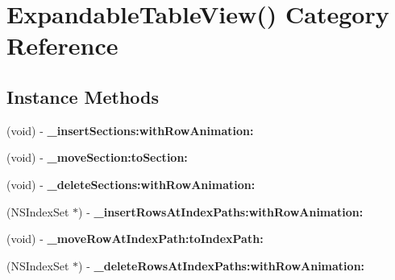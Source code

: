 \hypertarget{category_expandable_table_view_07_08}{\section{Expandable\-Table\-View() Category Reference}
\label{category_expandable_table_view_07_08}
}
\subsection*{Instance Methods}
\begin{DoxyCompactItemize}
\item 
\hypertarget{category_expandable_table_view_07_08_a7ec3087844f79fffff796ba6d897bdad}{(void) -\/ {\bfseries \-\_\-insert\-Sections\-:with\-Row\-Animation\-:}}\label{category_expandable_table_view_07_08_a7ec3087844f79fffff796ba6d897bdad}

\item 
\hypertarget{category_expandable_table_view_07_08_a74cdc0f4b8f277523ad07f548e80148f}{(void) -\/ {\bfseries \-\_\-move\-Section\-:to\-Section\-:}}\label{category_expandable_table_view_07_08_a74cdc0f4b8f277523ad07f548e80148f}

\item 
\hypertarget{category_expandable_table_view_07_08_a5efa2d8e890efcf5fd20f9a8a86a853b}{(void) -\/ {\bfseries \-\_\-delete\-Sections\-:with\-Row\-Animation\-:}}\label{category_expandable_table_view_07_08_a5efa2d8e890efcf5fd20f9a8a86a853b}

\item 
\hypertarget{category_expandable_table_view_07_08_a306f7e0615cdec37a9dc3ce03f2da56c}{(N\-S\-Index\-Set $\ast$) -\/ {\bfseries \-\_\-insert\-Rows\-At\-Index\-Paths\-:with\-Row\-Animation\-:}}\label{category_expandable_table_view_07_08_a306f7e0615cdec37a9dc3ce03f2da56c}

\item 
\hypertarget{category_expandable_table_view_07_08_a6c7084133c65766782f2c704ad3de7b5}{(void) -\/ {\bfseries \-\_\-move\-Row\-At\-Index\-Path\-:to\-Index\-Path\-:}}\label{category_expandable_table_view_07_08_a6c7084133c65766782f2c704ad3de7b5}

\item 
\hypertarget{category_expandable_table_view_07_08_a12a31973b43d3671fb61db7eac2903db}{(N\-S\-Index\-Set $\ast$) -\/ {\bfseries \-\_\-delete\-Rows\-At\-Index\-Paths\-:with\-Row\-Animation\-:}}\label{category_expandable_table_view_07_08_a12a31973b43d3671fb61db7eac2903db}

\end{DoxyCompactItemize}
